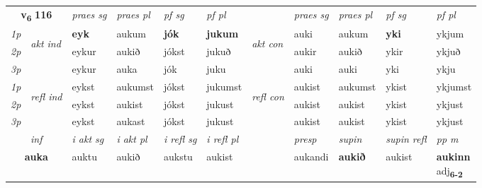 \noindent
\begin{tabular}{lllllllllll} \toprule
\multicolumn{2}{c}{\textbf{v{\textsubscript{6}}} \Large{\textbf{116}}}  &  \textit{praes sg}  & \textit{praes pl}  &\textit{ pf sg} & \textit{pf pl} &  &  \textit{praes sg}  & \textit{praes pl}  & \textit{pf sg} & \textit{pf pl } \\*
	\cmidrule{3-6} \cmidrule{8-11}
 {\textit{1p}} & \multirow{3}{*}{\begin{turn}{90}\textit{akt ind}\end{turn}} & \textbf{eyk} & aukum & \textbf{jók} & \textbf{jukum} & \multirow{3}{*}{\begin{turn}{90}\textit{akt con}\end{turn}} &auki & aukum & \textbf{yki} & ykjum\\*
 {\textit{2p}} &  &  eykur  & aukið & jókst & jukuð & & aukir & aukið & ykir & ykjuð \\*
{\textit{3p}} &  & eykur & auka & jók & juku & & auki & auki& yki & ykju \\*
\cmidrule{3-6} \cmidrule{8-11}
 {\textit{1p}} & \multirow{3}{*}{\begin{turn}{90}\textit{refl ind}\end{turn}}  & eykst & aukumst & jókst & jukumst & \multirow{3}{*}{\begin{turn}{90}\textit{refl con}\end{turn}}  &aukist & aukumst & ykist & ykjumst \\*
 {\textit{2p}} &  & eykst & aukist & jókst & jukust & &aukist & aukist & ykist & ykjust \\*
 {\textit{3p}}  & & eykst & aukast & jókst & jukust & & aukist & aukist& ykist & ykjust \\*
\cmidrule{3-6} \cmidrule{8-11}

   \multicolumn{2}{c}{\textit{inf}}  & \textit{i akt sg} & \textit{i akt pl} & \textit{i refl sg} & \textit{i refl pl} && \textit{presp} & \textit{supin} & \textit{supin refl} & \textit{pp m} \\*
  \multicolumn{2}{c}{\textbf{auka}} & auktu  & aukið & aukstu & aukist && aukandi &  \textbf{aukið} & aukist & \specialcell{\textbf{aukinn} \\ adj\textbf{\textsubscript{6-2}}} \\*
\end{tabular}

